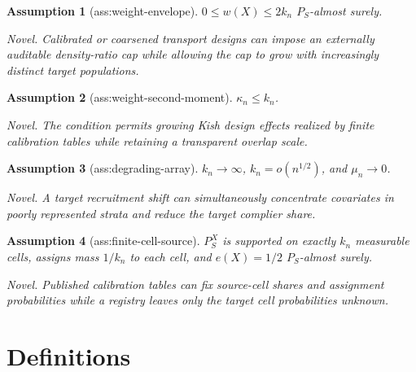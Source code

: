 \documentclass{article}
\newtheorem{assumption}{Assumption}
\begin{document}
\begin{assumption}[ass:weight-envelope]\label{ass:weight-envelope}
\(0\le w(X)\le2k_n\) \(P_S\)-almost surely.
\par\smallskip\noindent\emph{Novel.} Calibrated or coarsened transport designs can impose an externally auditable density-ratio cap while allowing the cap to grow with increasingly distinct target populations.
\end{assumption}

\begin{assumption}[ass:weight-second-moment]\label{ass:weight-second-moment}
\(\kappa_n\le k_n\).
\par\smallskip\noindent\emph{Novel.} The condition permits growing Kish design effects realized by finite calibration tables while retaining a transparent overlap scale.
\end{assumption}

\begin{assumption}[ass:degrading-array]\label{ass:degrading-array}
\(k_n\to\infty\), \(k_n=o(n^{1/2})\), and \(\mu_n\to0\).
\par\smallskip\noindent\emph{Novel.} A target recruitment shift can simultaneously concentrate covariates in poorly represented strata and reduce the target complier share.
\end{assumption}

\begin{assumption}[ass:finite-cell-source]\label{ass:finite-cell-source}
\(P_S^X\) is supported on exactly \(k_n\) measurable cells, assigns mass \(1/k_n\) to each cell, and \(e(X)=1/2\) \(P_S\)-almost surely.
\par\smallskip\noindent\emph{Novel.} Published calibration tables can fix source-cell shares and assignment probabilities while a registry leaves only the target cell probabilities unknown.
\end{assumption}

\section{Definitions}
\end{document}
